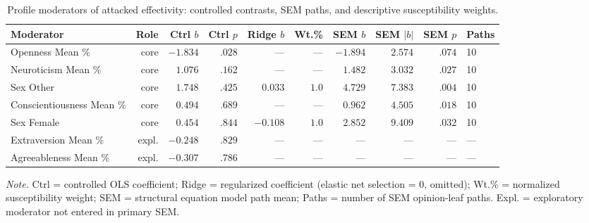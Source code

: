 \begin{table}[htbp]
\centering
\begin{threeparttable}
\caption{Profile moderators of attacked effectivity: controlled contrasts, SEM paths, and descriptive susceptibility weights.}
\label{tab:multivariate}
\small
\setlength{\tabcolsep}{4pt}
\renewcommand{\arraystretch}{1.10}
\begin{tabularx}{\linewidth}{Xrrrrrrrrl}
\toprule
Moderator & Role & Ctrl $b$ & Ctrl $p$ & Ridge $b$ & Wt.\% & SEM $b$ & SEM $|b|$ & SEM $p$ & Paths \\
\midrule
Openness Mean \%    & core & $-1.834$ & $.028$ & ---    & ---   & $-1.894$ & $2.574$ & $.074$ & 10 \\
Neuroticism Mean \% & core & $1.076$  & $.162$ & ---    & ---   & $1.482$  & $3.032$ & $.027$ & 10 \\
Sex Other           & core & $1.748$  & $.425$ & $0.033$ & $1.0$ & $4.729$  & $7.383$ & $.004$ & 10 \\
Conscientiousness Mean \% & core & $0.494$ & $.689$ & --- & --- & $0.962$ & $4.505$ & $.018$ & 10 \\
Sex Female          & core & $0.454$  & $.844$ & $-0.108$ & $1.0$ & $2.852$ & $9.409$ & $.032$ & 10 \\
Extraversion Mean \%  & expl. & $-0.248$ & $.829$ & --- & --- & --- & --- & --- & --- \\
Agreeableness Mean \% & expl. & $-0.307$ & $.786$ & --- & --- & --- & --- & --- & --- \\
\bottomrule
\end{tabularx}
\begin{tablenotes}[flushleft]
\footnotesize
\item \textit{Note.} Ctrl = controlled OLS coefficient; Ridge = regularized coefficient (elastic net selection = 0, omitted); Wt.\% = normalized susceptibility weight; SEM = structural equation model path mean; Paths = number of SEM opinion-leaf paths. Expl. = exploratory moderator not entered in primary SEM.
\end{tablenotes}
\end{threeparttable}
\end{table}
